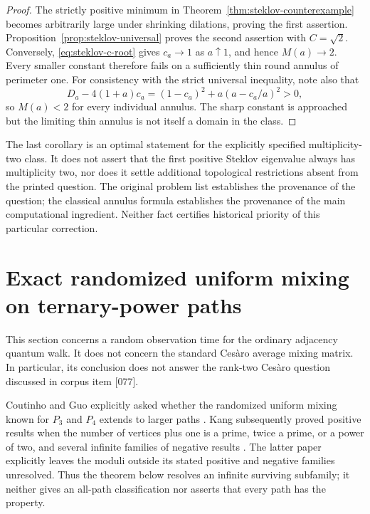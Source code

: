 \documentclass[11pt,a4paper]{article}
\theoremstyle{definition}\newtheorem{definition}[theorem]{Definition}
\theoremstyle{remark}\newtheorem{remark}[theorem]{Remark}
\begin{document}
\begin{proof}
The strictly positive minimum in Theorem~\ref{thm:steklov-counterexample}
becomes arbitrarily large under shrinking dilations, proving the first
assertion. Proposition~\ref{prop:steklov-universal} proves the second
assertion with $C=\sqrt2$. Conversely, \eqref{eq:steklov-c-root} gives
$c_a\to1$ as $a\uparrow1$, and hence $M(a)\to2$. Every smaller constant
therefore fails on a sufficiently thin round annulus of perimeter one.
For consistency with the strict universal inequality, note also that
\[
 D_a-4(1+a)c_a=(1-c_a)^2+a(a-c_a/a)^2>0,
\]
so $M(a)<2$ for every individual annulus. The sharp constant is approached
but the limiting thin annulus is not itself a domain in the class.
\end{proof}

The last corollary is an optimal statement for the explicitly specified
multiplicity-two class. It does not assert that the first positive
Steklov eigenvalue always has multiplicity two, nor does it settle
additional topological restrictions absent from the printed question.
The original problem list establishes the provenance of the question;
the classical annulus formula establishes the provenance of the main
computational ingredient. Neither fact certifies historical priority of
this particular correction.
\section{Exact randomized uniform mixing on ternary-power paths}
\label{sec:ternary-paths}

This section concerns a random observation time for the ordinary adjacency
quantum walk. It does not concern the standard Ces\`aro average mixing
matrix. In particular, its conclusion does not answer the rank-two
Ces\`aro question discussed in corpus item [077].

Coutinho and Guo explicitly asked whether the randomized uniform mixing
known for $P_3$ and $P_4$ extends to larger paths
\cite[Section~4.2]{CoutinhoGuo2024}. Kang subsequently proved positive
results when the number of vertices plus one is a prime, twice a prime,
or a power of two, and several infinite families of negative results
\cite{Kang2026}. The latter paper explicitly leaves the moduli outside
its stated positive and negative families unresolved. Thus the theorem
below resolves an infinite surviving subfamily; it neither gives an
all-path classification nor asserts that every path has the property.
\end{document}

